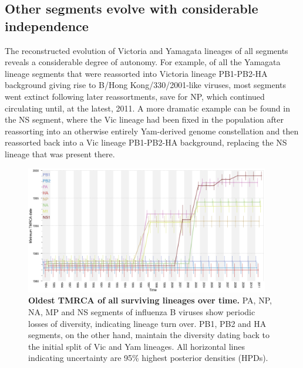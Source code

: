 \documentclass[11pt,oneside,letterpaper]{article}
\begin{document}
\subsection*{Other segments evolve with considerable independence}
The reconstructed evolution of Victoria and Yamagata lineages of all segments reveals a considerable degree of autonomy.
For example, of all the Yamagata lineage segments that were reassorted into Victoria lineage PB1-PB2-HA background giving rise to B/Hong Kong/330/2001-like viruses, most segments went extinct following later reassortments, save for NP, which continued circulating until, at the latest, 2011.
A more dramatic example can be found in the NS segment, where the Vic lineage had been fixed in the population after reassorting into an otherwise entirely Yam-derived genome constellation and then reassorted back into a Vic lineage PB1-PB2-HA background, replacing the NS lineage that was present there. 

\begin{figure}[h]
	\centering		
	\includegraphics[width=0.95\textwidth]{figures/InfB_tmrcaOT_lines.png}
	\caption{\textbf{Oldest TMRCA of all surviving lineages over time.}
PA, NP, NA, MP and NS segments of influenza B viruses show periodic losses of diversity, indicating lineage turn over.
PB1, PB2 and HA segments, on the other hand, maintain the diversity dating back to the initial split of Vic and Yam lineages.
All horizontal lines indicating uncertainty are 95\% highest posterior densities (HPDs).}
	\label{tmrcaOT}
\end{figure}
\end{document}
